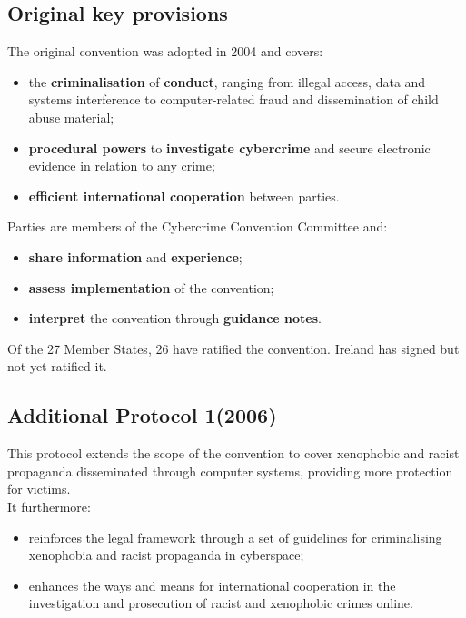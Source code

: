 \subsection{Original key provisions}
The original convention was adopted in 2004 and covers:
\begin{itemize}
  \item the \textbf{criminalisation} of \textbf{conduct}, ranging from
    illegal access, data and systems interference to computer-related
    fraud and dissemination of child abuse material;
  \item \textbf{procedural powers} to \textbf{investigate cybercrime}
    and secure electronic evidence in relation to any crime;
  \item \textbf{efficient international cooperation} between parties.
\end{itemize}

Parties are members of the Cybercrime Convention Committee and:
\begin{itemize}
  \item \textbf{share information} and \textbf{experience};
  \item \textbf{assess implementation} of the convention;
  \item \textbf{interpret} the convention through \textbf{guidance
    notes}.
\end{itemize}

Of the 27 Member States, 26 have ratified the convention. Ireland
has signed but not yet ratified it.

\subsection{Additional Protocol 1(2006)}
This protocol extends the scope of the convention to cover xenophobic
and racist propaganda disseminated through computer systems, providing
more protection for victims.\\
It furthermore:
\begin{itemize}
  \item reinforces the legal framework through a set of guidelines for
    criminalising xenophobia and racist propaganda in cyberspace;
  \item enhances the ways and means for international cooperation in the
    investigation and prosecution of racist and xenophobic crimes online.
\end{itemize}

